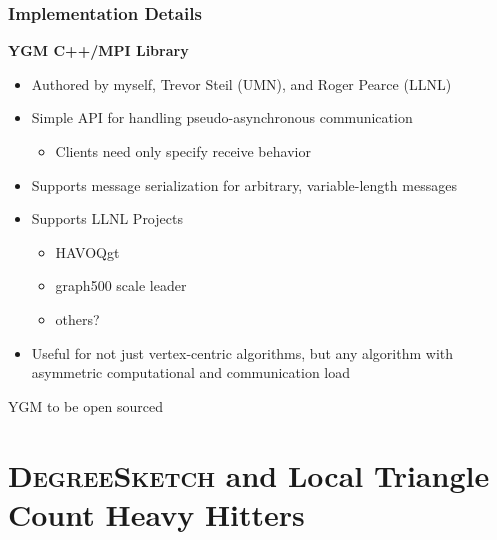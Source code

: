 \documentclass{beamer}
\newcommand{\algoname}[1]{\textnormal{\textsc{#1}}}
\begin{document}
\begin{frame}
\frametitle{Implementation Details}


\textbf{\algoname{YGM} C++/MPI Library}
\begin{itemize}
	\item Authored by myself, Trevor Steil (UMN), and Roger Pearce (LLNL)
	\item Simple API for handling pseudo-asynchronous communication
	\begin{itemize}
		\item Clients need only specify receive behavior
	\end{itemize}
	\item Supports message serialization for arbitrary, variable-length messages
	\item Supports LLNL Projects
	\begin{itemize}
		\item HAVOQgt
		\item graph500 scale leader
		\item others?
	\end{itemize}
	\item Useful for not just vertex-centric algorithms, but any algorithm with asymmetric computational and communication load
\end{itemize}

\begin{block}{}
	\begin{center}
		\algoname{YGM} to be open sourced	
	\end{center}
\end{block}

\end{frame}


\section{\algoname{DegreeSketch} and Local Triangle Count Heavy Hitters}
\end{document}
